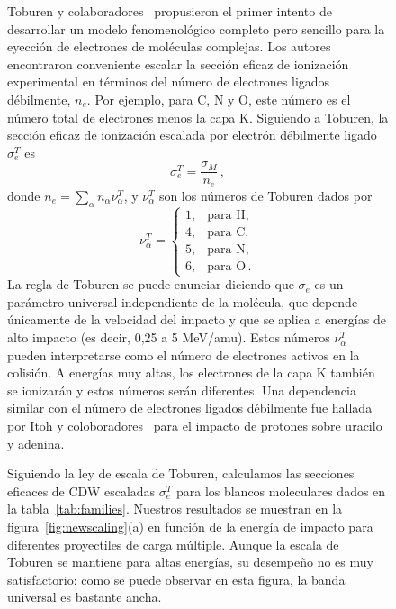 \begin{figure}
Toburen y colaboradores~\cite{toburen1975,toburen1976} propusieron el 
primer intento de desarrollar un modelo fenomenológico completo pero 
sencillo para la eyección de electrones de moléculas complejas. Los 
autores encontraron conveniente escalar la sección eficaz de ionización 
experimental en términos del número de electrones ligados débilmente, $n_e$.
Por ejemplo, para C, N y O, este número es el número total de 
electrones menos la capa K. Siguiendo a Toburen, la sección eficaz de 
ionización escalada por electrón débilmente ligado $\sigma_{e}^T$ es
\begin{equation}
\sigma_{e}^T=\frac{\sigma_{M}}{n_e}\,, 
\label{27} 
\end{equation}
donde $n_e=\sum_{\alpha}n_{\alpha}\nu_{\alpha}^T$, y $\nu_{\alpha}^T$ 
son los números de Toburen dados por
\begin{equation}
\nu_{\alpha}^T=\left\{ 
\begin{array}{ll}
1, & \text{para H,} \\
4, & \text{para C,} \\ 
5, & \text{para N,} \\ 
6, & \text{para O}\,.
\end{array}\right.
\label{eq:nelec} 
\end{equation} 
La regla de Toburen se puede enunciar diciendo que $\sigma_{e}$ es un 
parámetro universal independiente de la molécula, que depende únicamente 
de la velocidad del impacto y que se aplica a energías de alto impacto 
(es decir, 0,25 a 5 MeV/amu). Estos números $\nu_{\alpha}^T$ pueden 
interpretarse como el número de electrones activos en la colisión. A 
energías muy altas, los electrones de la capa K también se ionizarán y 
estos números serán diferentes. Una dependencia similar con el número de 
electrones ligados débilmente fue hallada por Itoh y 
coloboradores~\cite{itoh2013} para el impacto de protones sobre uracilo 
y adenina.

Siguiendo la ley de escala de Toburen, calculamos las secciones eficaces 
de CDW escaladas $\sigma_{e}^T$ para los blancos moleculares dados en la
tabla~\ref{tab:families}. Nuestros resultados se muestran en la 
figura~\ref{fig:newscaling}(a) en función de la energía de impacto para 
diferentes proyectiles de carga múltiple. Aunque la escala de Toburen 
se mantiene para altas energías, su desempeño no es muy satisfactorio: 
como se puede observar en esta figura, la banda universal es bastante 
ancha.



\end{figure}
